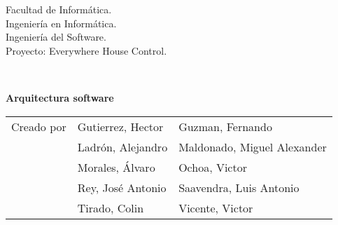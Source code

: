 \begin{titlepage}
    \begin{scriptsize}\noindent Facultad de Informática.\\
        Ingeniería en Informática.\\
        Ingeniería del Software.\\
        Proyecto: Everywhere House Control.
    \end{scriptsize}\\
    \vfill
    \begin{center}
        \begin{Large}
            \textbf{Arquitectura software}
        \end{Large}
    \end{center}
    \vfill
    \begin{flushright}
        \begin{scriptsize}
            \begin{tabular}{lll}
            Creado por & Gutierrez, Hector & Guzman, Fernando  \\
                 & Ladrón, Alejandro & Maldonado, Miguel Alexander \\
                 & Morales, Álvaro & Ochoa, Victor \\
                 & Rey, José Antonio & Saavendra, Luis Antonio  \\
                 & Tirado, Colin & Vicente, Victor \\
            \end{tabular}
        \end{scriptsize}
    \end{flushright}
\end{titlepage}
\thispagestyle{empty}
\cleardoublepage
\newpage

\tableofcontents
\newpage
\thispagestyle{empty}
\cleardoublepage
\newpage
{}
\raggedbottom
{}














